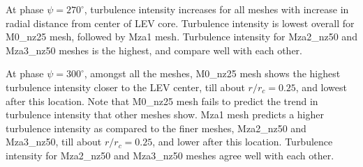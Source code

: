 At phase $\psi = 270^\circ$, turbulence intensity increases for all meshes with increase in radial distance from center of LEV core.
Turbulence intensity is lowest overall for M0\_nz25 mesh, followed by Mza1 mesh. Turbulence intensity for Mza2\_nz50 and Mza3\_nz50 meshes is the highest, and compare well with each other.

At phase $\psi = 300^\circ$, amongst all the meshes, M0\_nz25 mesh shows the highest turbulence intensity closer to the LEV center, till about $r/r_c = 0.25$, and lowest after this location.
Note that M0\_nz25 mesh fails to predict the trend in turbulence intensity that other meshes show.
Mza1 mesh predicts a higher turbulence intensity as compared to the finer meshes, Mza2\_nz50 and Mza3\_nz50, till about $r/r_c = 0.25$, and lower after this location.
Turbulence intensity for Mza2\_nz50 and Mza3\_nz50 meshes agree well with each other. 


